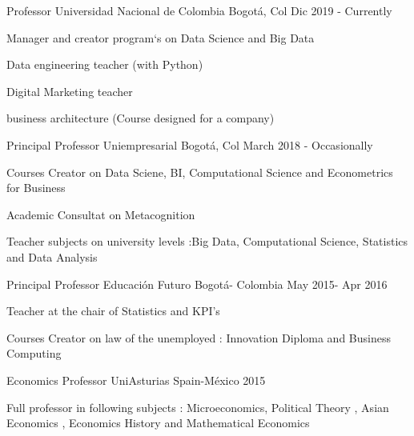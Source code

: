 

\begin{cventries}

\cventry
    {Professor}
    {Universidad Nacional de Colombia}
    {Bogotá, Col}
    {Dic 2019 - Currently}
    {
    \begin{cvitems}
    \item {Manager and creator program`s on Data Science and Big Data}
    \item {Data engineering teacher (with Python)}
    \item {Digital Marketing teacher}
    \item {business architecture (Course designed for a company)}
    \end{cvitems}
    }
    



  \cventry
    {Principal Professor } %
    {Uniempresarial} %
    {Bogotá, Col} %
    {March 2018 - Occasionally} %
    {
      \begin{cvitems} %
        \item {Courses Creator on Data Sciene, BI, Computational Science and Econometrics for Business}
        \item {Academic Consultat on Metacognition }
        \item {Teacher  subjects on university levels :Big Data, Computational Science, Statistics and Data Analysis}
      \end{cvitems}
    }

  \cventry
    {Principal Professor} %
    {Educación Futuro} %
    {Bogotá- Colombia} %
    {May 2015- Apr 2016} %
    {
      \begin{cvitems} %
        \item {Teacher at the chair of Statistics and KPI's}
        \item {Courses Creator on law of the unemployed : Innovation Diploma and Business Computing}
      \end{cvitems}
    }

  \cventry
    {Economics Professor} %
    {UniAsturias} %
    {Spain-México } %
    {2015} %
    {
      \begin{cvitems} %
        \item {Full professor in following subjects : Microeconomics, Political Theory , Asian Economics , Economics History and Mathematical Economics}
      \end{cvitems}
    }

\end{cventries}
